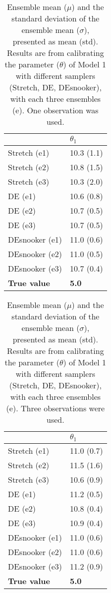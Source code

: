 \begin{table}[ht]
\caption{Ensemble mean ($\mu$) and the standard deviation of the ensemble mean ($\sigma$), presented as mean (std). Results are from calibrating the parameter ($\theta$) of Model 1 with different samplers (Stretch, DE, DEsnooker), with each three ensembles (e). One observation was used.}
\label{tab_logbook8_obs1_model1}
\begin{tabularx}{\textwidth}{XX}
\toprule
 & $\theta_1$ \\
\midrule
Stretch (e1) & 10.3 (1.1) \\
Stretch (e2) & 10.8 (1.5) \\
Stretch (e3) & 10.3 (2.0) \\
\midrule
DE (e1) & 10.6 (0.8) \\
DE (e2) & 10.7 (0.5) \\
DE (e3) & 10.7 (0.5) \\
\midrule
DEsnooker (e1) & 11.0 (0.6) \\
DEsnooker (e2) & 11.0 (0.5) \\
DEsnooker (e3) & 10.7 (0.4) \\
\midrule
\textbf{True value} & \textbf{5.0} \\
\bottomrule
\end{tabularx}
\end{table}


\begin{table}[ht]
\caption{Ensemble mean ($\mu$) and the standard deviation of the ensemble mean ($\sigma$), presented as mean (std). Results are from calibrating the parameter ($\theta$) of Model 1 with different samplers (Stretch, DE, DEsnooker), with each three ensembles (e). Three observations were used.}
\label{tab_logbook8_obs3_model1}
\begin{tabularx}{\textwidth}{XX}
\toprule
 & $\theta_1$ \\
\midrule
Stretch (e1) & 11.0 (0.7) \\
Stretch (e2) & 11.5 (1.6) \\
Stretch (e3) & 10.6 (0.9) \\
\midrule
DE (e1) & 11.2 (0.5) \\
DE (e2) & 10.8 (0.4) \\
DE (e3) & 10.9 (0.4) \\
\midrule
DEsnooker (e1) & 11.0 (0.6) \\
DEsnooker (e2) & 11.0 (0.6) \\
DEsnooker (e3) & 11.2 (0.9) \\
\midrule
\textbf{True value} & \textbf{5.0} \\
\bottomrule
\end{tabularx}
\end{table}


